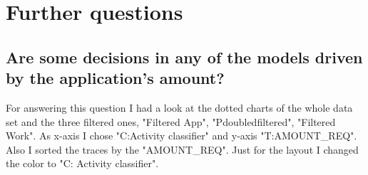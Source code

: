 \section{Further questions}

\subsection{Are some decisions in any of the models driven by the application's amount?}
For answering this question I had a look at the dotted charts of the whole data set and the three filtered ones, "Filtered App", "Pdoubledfiltered", "Filtered Work". As x-axis I chose "C:Activity classifier" and y-axis "T:AMOUNT\_REQ". Also I sorted the traces by the "AMOUNT\_REQ". Just for the layout I changed the color to "C: Activity classifier".

